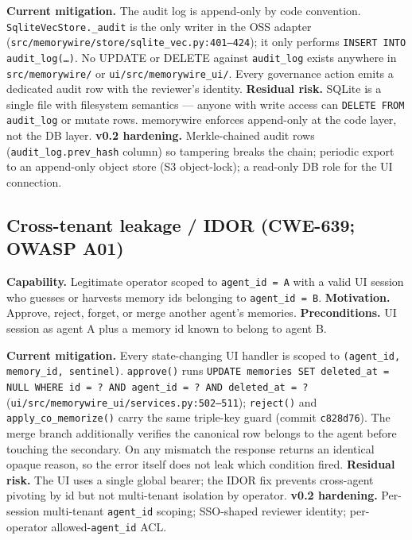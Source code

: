 \documentclass[11pt,letterpaper,twocolumn]{article}
\begin{document}
\textbf{Current mitigation.} The audit log is append-only by code convention. \texttt{SqliteVecStore.\_audit} is the only writer in the OSS adapter (\texttt{src/memorywire/store/sqlite\_vec.py:401--424}); it only performs \texttt{INSERT INTO audit\_log(\ldots)}. No UPDATE or DELETE against \texttt{audit\_log} exists anywhere in \texttt{src/memorywire/} or \texttt{ui/src/memorywire\_ui/}. Every governance action emits a dedicated audit row with the reviewer's identity. \textbf{Residual risk.} SQLite is a single file with filesystem semantics --- anyone with write access can \texttt{DELETE FROM audit\_log} or mutate rows. memorywire enforces append-only at the code layer, not the DB layer. \textbf{v0.2 hardening.} Merkle-chained audit rows (\texttt{audit\_log.prev\_hash} column) so tampering breaks the chain; periodic export to an append-only object store (S3 object-lock); a read-only DB role for the UI connection.

\subsection{Cross-tenant leakage / IDOR (CWE-639; OWASP A01)}
\label{sec:threats-idor}

\textbf{Capability.} Legitimate operator scoped to \texttt{agent\_id = A} with a valid UI session who guesses or harvests memory ids belonging to \texttt{agent\_id = B}. \textbf{Motivation.} Approve, reject, forget, or merge another agent's memories. \textbf{Preconditions.} UI session as agent A plus a memory id known to belong to agent B.

\textbf{Current mitigation.} Every state-changing UI handler is scoped to \texttt{(agent\_id, memory\_id, sentinel)}. \texttt{approve()} runs \texttt{UPDATE memories SET deleted\_at = NULL WHERE id = ? AND agent\_id = ? AND deleted\_at = ?} (\texttt{ui/src/memorywire\_ui/services.py:502--511}); \texttt{reject()} and \texttt{apply\_co\_memorize()} carry the same triple-key guard (commit \texttt{c828d76}). The merge branch additionally verifies the canonical row belongs to the agent before touching the secondary. On any mismatch the response returns an identical opaque reason, so the error itself does not leak which condition fired. \textbf{Residual risk.} The UI uses a single global bearer; the IDOR fix prevents cross-agent pivoting by id but not multi-tenant isolation by operator. \textbf{v0.2 hardening.} Per-session multi-tenant \texttt{agent\_id} scoping; SSO-shaped reviewer identity; per-operator allowed-\texttt{agent\_id} ACL.
\end{document}
